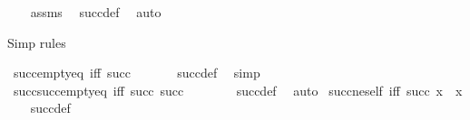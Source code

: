 \begin{isabellebody}
%
\isadelimproof
\ \ %
\endisadelimproof
%
\isatagproof
{}\isamarkupfalse%
\ assms\ \isamarkupfalse%
\ succ{\isacharunderscore}{\kern0pt}def\ \isamarkupfalse%
\ auto%
\endisatagproof
{\isafoldproof}%
%
\isadelimproof
%
\endisadelimproof
%
\begin{isamarkuptext}%
Simp rules%
\end{isamarkuptext}\isamarkuptrue%
\isamarkupfalse%
\ succ{\isacharunderscore}{\kern0pt}empty{\isacharunderscore}{\kern0pt}eq\ {\isacharbrackleft}{\kern0pt}iff{\isacharbrackright}{\kern0pt}{\isacharcolon}{\kern0pt}\ {\isachardoublequoteopen}succ\ {\isacharbraceleft}{\kern0pt}{\isacharbraceright}{\kern0pt}\ {\isacharequal}{\kern0pt}\ {\isacharbraceleft}{\kern0pt}{\isacharbraceleft}{\kern0pt}{\isacharbraceright}{\kern0pt}{\isacharbraceright}{\kern0pt}{\isachardoublequoteclose}\isanewline
%
\isadelimproof
\ \ %
\endisadelimproof
%
\isatagproof
{}\isamarkupfalse%
\ succ{\isacharunderscore}{\kern0pt}def\ \isamarkupfalse%
\ simp%
\endisatagproof
{\isafoldproof}%
%
\isadelimproof
\isanewline
%
\endisadelimproof
\isanewline
{}\isamarkupfalse%
\ succ{\isacharunderscore}{\kern0pt}succ{\isacharunderscore}{\kern0pt}empty{\isacharunderscore}{\kern0pt}eq\ {\isacharbrackleft}{\kern0pt}iff{\isacharbrackright}{\kern0pt}{\isacharcolon}{\kern0pt}\ {\isachardoublequoteopen}succ\ {\isacharparenleft}{\kern0pt}succ\ {\isacharbraceleft}{\kern0pt}{\isacharbraceright}{\kern0pt}{\isacharparenright}{\kern0pt}\ {\isacharequal}{\kern0pt}\ {\isacharbraceleft}{\kern0pt}{\isacharbraceleft}{\kern0pt}{\isacharbraceright}{\kern0pt}{\isacharcomma}{\kern0pt}\ {\isacharbraceleft}{\kern0pt}{\isacharbraceleft}{\kern0pt}{\isacharbraceright}{\kern0pt}{\isacharbraceright}{\kern0pt}{\isacharbraceright}{\kern0pt}{\isachardoublequoteclose}\isanewline
%
\isadelimproof
\ \ %
\endisadelimproof
%
\isatagproof
{}\isamarkupfalse%
\ succ{\isacharunderscore}{\kern0pt}def\ \isamarkupfalse%
\ auto%
\endisatagproof
{\isafoldproof}%
%
\isadelimproof
\isanewline
%
\endisadelimproof
\isanewline
{}\isamarkupfalse%
\ succ{\isacharunderscore}{\kern0pt}ne{\isacharunderscore}{\kern0pt}self\ {\isacharbrackleft}{\kern0pt}iff{\isacharbrackright}{\kern0pt}{\isacharcolon}{\kern0pt}\ {\isachardoublequoteopen}succ\ x\ {\isasymnoteq}\ x{\isachardoublequoteclose}\isanewline
%
\isadelimproof
\ \ %
\endisadelimproof
%
\isatagproof
{}\isamarkupfalse%
\ succ{\isacharunderscore}{\kern0pt}def\ \isamarkupfalse%

\end{isabellebody}
